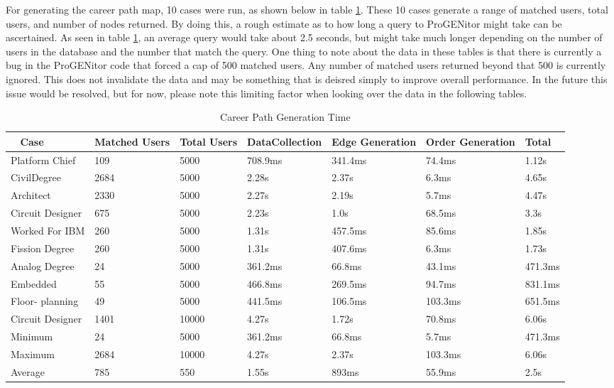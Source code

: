 For generating the career path map, 10 cases were run, as shown below in table
\ref{table:career performance}.  These 10 cases generate a range of matched
users, total users, and number of nodes returned.  By doing this, a rough estimate as to how
long a query to ProGENitor might take can be ascertained.  As seen in table
\ref{table:career performance}, an average query would take about 2.5 seconds,
but might take much longer depending on the number of users in the database and the number that
match the query.  One thing to note about the data in these tables is that there
is currently a bug in the ProGENitor code that forced a cap of 500 matched
users.  Any number of matched users returned beyond that 500 is currently
ignored.  This does not invalidate the data and may be something that is deisred
simply to improve overall performance.  In the future this issue would be
resolved, but for now, please note this limiting factor when looking over the
data in the following tables.

\begin{table}[H]
  \centering
  \begin{tabular}{|p{17mm}|p{16mm}|p{10mm}|p{18mm}|p{19mm}|p{20mm}|p{14mm}|}
  \hline
  \
  Case&Matched Users&Total Users&Data\newline Collection&Edge\newline
  Generation&Order Generation&Total\\
  \hline\hline
  Platform Chief&109&5000&708.9ms&341.4ms&74.4ms&1.12s\\ \hline
  Civil\newline Degree&2684&5000&2.28s&2.37s&6.3ms&4.65s\\ \hline 
  Architect&2330&5000&2.27s&2.19s&5.7ms&4.47s\\ \hline
  Circuit Designer&675&5000&2.23s&1.0s&68.5ms&3.3s\\ \hline
  Worked For IBM&260&5000&1.31s&457.5ms&85.6ms&1.85s\\ \hline
  Fission Degree&260&5000&1.31s&407.6ms&6.3ms&1.73s\\ \hline
  Analog Degree&24&5000&361.2ms&66.8ms&43.1ms&471.3ms\\ \hline
  Embedded&55&5000&466.8ms&269.5ms&94.7ms&831.1ms\\ \hline
  Floor- \newline planning&49&5000&441.5ms&106.5ms&103.3ms&651.5ms\\ \hline
  Circuit Designer&1401&10000&4.27s&1.72s&70.8ms&6.06s\\ \hline
  \hline\hline
  Minimum&24&5000&361.2ms&66.8ms&5.7ms&471.3ms\\ \hline
  Maximum&2684&10000&4.27s&2.37s&103.3ms&6.06s\\ \hline
  Average&785&550&1.55s&893ms&55.9ms&2.5s\\ \hline
  \end{tabular}
  \caption{Career Path Generation Time}
  \label{table:career performance}
\end{table}

